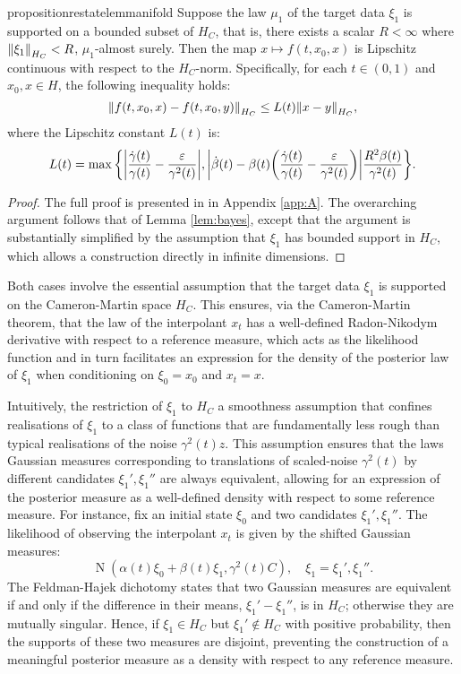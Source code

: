 \begin{restatable}{proposition}{restatelemmanifold}\label{lem:manifold}
  Suppose the law \(\mu_{1}\) of the target data \(\xi_{1}\) is supported on a bounded subset of \(H_{C}\), that is, there exists a scalar \(R < \infty\) where \(\norm{\xi_{1}}_{H_{C}} < R\), \(\mu_{1}\)-almost surely. Then the map \(x \mapsto f(t, x_{0}, x)\) is Lipschitz continuous with respect to the \(H_{C}\)-norm. Specifically, for each \(t \in (0, 1)\) and \(x_{0}, x \in H\), the following inequality holds:
  \[
    \norm{f(t, x_{0}, x) - f(t, x_{0}, y)}_{H_{C}} \leq L(t) \norm{x - y}_{H_{C}},
  \]
  where the Lipschitz constant \(L(t)\) is:
  \[
    L(t) =  \mathop{\underset{}{\max}}\qty{\abs{\frac{\dot{\gamma}(t)}{\gamma(t)} - \frac{\varepsilon}{\gamma^{2}(t)}}, \abs{\dot{\beta}(t) - \beta(t)\qty(\frac{\dot{\gamma}(t)}{\gamma(t)} - \frac{\varepsilon}{\gamma^{2}(t)})} \frac{R^{2} \beta(t)}{\gamma^{2}(t)}}.
  \]
\end{restatable}
\begin{proof}
  The full proof is presented in  in Appendix \ref{app:A}. The overarching argument follows that of Lemma \ref{lem:bayes}, except that the argument is substantially simplified by the assumption that \(\xi_{1}\) has bounded support in \(H_{C}\), which allows a construction directly in infinite dimensions.
\end{proof}
\begin{remark}\label{rem:hc}
  Both cases involve the essential assumption that the target data \(\xi_{1}\) is supported on the Cameron-Martin space \(H_{C}\). This ensures, via the Cameron-Martin theorem, that the law of the interpolant \(x_{t}\) has a well-defined Radon-Nikodym derivative with respect to a reference measure, which acts as the likelihood function and in turn facilitates an expression for the density of the posterior law of \(\xi_{1}\) when conditioning on \(\xi_{0}=x_{0}\) and \(x_{t}=x\).

  Intuitively, the restriction of \(\xi_{1}\) to \(H_{C}\) a smoothness assumption that confines realisations of \(\xi_{1}\) to a class of functions that are fundamentally less rough than typical realisations of the noise \(\gamma^{2}(t) z\). This assumption ensures that the laws Gaussian measures corresponding to translations of scaled-noise \(\gamma^{2}(t)\) by different candidates \(\xi_{1}', \xi_{1}''\) are always equivalent, allowing for an expression of the posterior measure as a well-defined density with respect to some reference measure. For instance, fix an initial state \(\xi_{0}\) and two candidates \(\xi_{1}', \xi_{1}''\). The likelihood of observing the interpolant \(x_{t}\) is given by the shifted Gaussian measures:
  \[\operatorname{N}(\alpha(t) \xi_{0} + \beta(t) \xi_{1}, \gamma^{2}(t) C), \quad \xi_{1} = \xi_{1}',\xi_{1}''.\]
  The Feldman-Hajek dichotomy states that two Gaussian measures are equivalent if and only if the difference in their means, \(\xi_{1}' - \xi_{1}''\), is in \(H_{C}\); otherwise they are mutually singular. Hence, if \(\xi_{1} \in H_{C}\) but \(\xi_{1}' \notin H_{C}\) with positive probability, then the supports of these two measures are disjoint, preventing the construction of a meaningful posterior measure as a density with respect to any reference measure.
\end{remark}
